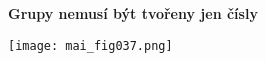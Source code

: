 \wikitextrule
\begin{example}\label{mai:exam051}
  \textbf{Grupy nemusí být tvořeny jen čísly}\newline\small
  
  {\centering
    \captionsetup{type=figure}
    \texttt{[image: mai\_fig037.png]}
    \par}
  \normalsize
\end{example}
